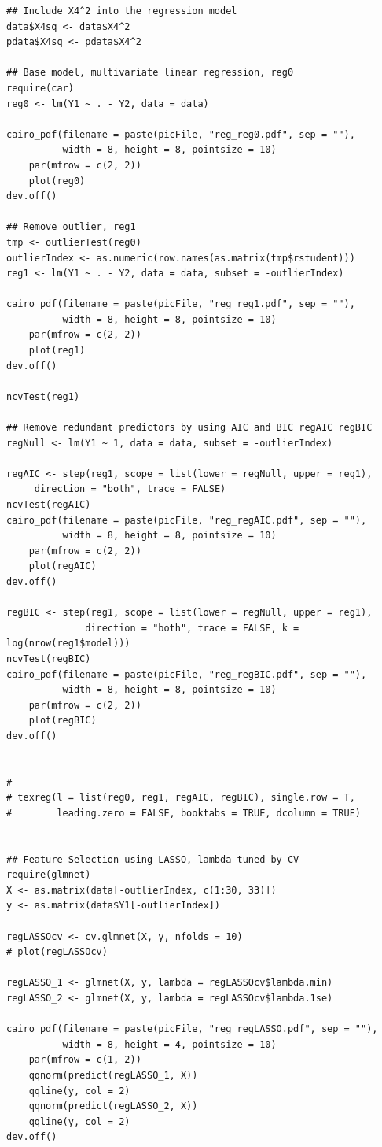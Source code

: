 \documentclass[11pt,oneside,a4paper]{article}
\begin{document}
\begin{verbatim}
## Include X4^2 into the regression model
data$X4sq <- data$X4^2
pdata$X4sq <- pdata$X4^2

## Base model, multivariate linear regression, reg0
require(car)
reg0 <- lm(Y1 ~ . - Y2, data = data)

cairo_pdf(filename = paste(picFile, "reg_reg0.pdf", sep = ""), 
          width = 8, height = 8, pointsize = 10)
    par(mfrow = c(2, 2))
    plot(reg0)
dev.off()

## Remove outlier, reg1
tmp <- outlierTest(reg0)
outlierIndex <- as.numeric(row.names(as.matrix(tmp$rstudent)))
reg1 <- lm(Y1 ~ . - Y2, data = data, subset = -outlierIndex)

cairo_pdf(filename = paste(picFile, "reg_reg1.pdf", sep = ""), 
          width = 8, height = 8, pointsize = 10)
    par(mfrow = c(2, 2))
    plot(reg1)
dev.off()

ncvTest(reg1)

## Remove redundant predictors by using AIC and BIC regAIC regBIC
regNull <- lm(Y1 ~ 1, data = data, subset = -outlierIndex)

regAIC <- step(reg1, scope = list(lower = regNull, upper = reg1), 
     direction = "both", trace = FALSE)
ncvTest(regAIC)
cairo_pdf(filename = paste(picFile, "reg_regAIC.pdf", sep = ""), 
          width = 8, height = 8, pointsize = 10)
    par(mfrow = c(2, 2))
    plot(regAIC)
dev.off()

regBIC <- step(reg1, scope = list(lower = regNull, upper = reg1), 
              direction = "both", trace = FALSE, k = log(nrow(reg1$model)))
ncvTest(regBIC)
cairo_pdf(filename = paste(picFile, "reg_regBIC.pdf", sep = ""), 
          width = 8, height = 8, pointsize = 10)
    par(mfrow = c(2, 2))
    plot(regBIC)
dev.off()


# 
# texreg(l = list(reg0, reg1, regAIC, regBIC), single.row = T,
#        leading.zero = FALSE, booktabs = TRUE, dcolumn = TRUE)


## Feature Selection using LASSO, lambda tuned by CV
require(glmnet)
X <- as.matrix(data[-outlierIndex, c(1:30, 33)])
y <- as.matrix(data$Y1[-outlierIndex])

regLASSOcv <- cv.glmnet(X, y, nfolds = 10)
# plot(regLASSOcv)

regLASSO_1 <- glmnet(X, y, lambda = regLASSOcv$lambda.min)
regLASSO_2 <- glmnet(X, y, lambda = regLASSOcv$lambda.1se)

cairo_pdf(filename = paste(picFile, "reg_regLASSO.pdf", sep = ""), 
          width = 8, height = 4, pointsize = 10)
    par(mfrow = c(1, 2))
    qqnorm(predict(regLASSO_1, X))
    qqline(y, col = 2)
    qqnorm(predict(regLASSO_2, X))
    qqline(y, col = 2)
dev.off()



\end{verbatim}
\end{document}
